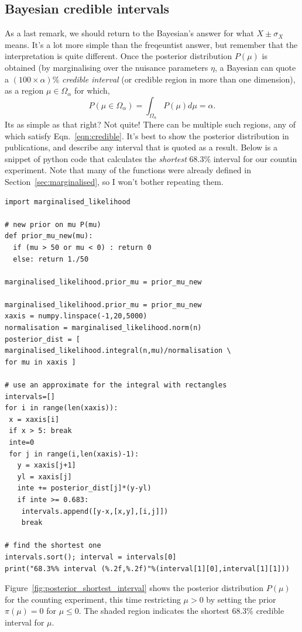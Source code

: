 \subsection{Bayesian credible intervals}
As a last remark, we should return to the Bayesian's answer for what $X\pm\sigma_{X}$ means. It's a lot more simple than the freqeuntist answer, but remember that the interpretation is quite different. Once the posterior distribution $P(\mu)$ is obtained (by marginalising over the nuisance parameters $\eta$, a Bayesian can quote a $(100\times\alpha)$\% \emph{credible interval} (or credible region in more than one dimension), as a region $\mu\in\Omega_{\alpha}$ for which,
\begin{equation}\label{eqn:credible}
    P(\mu\in\Omega_{\alpha})=\int_{\Omega_{\alpha}} P(\mu)d\mu = \alpha.
\end{equation}
Its as simple as that right? Not quite! There can be multiple such regions, any of which satisfy Eqn.~\ref{eqn:credible}. It's best to show the posterior distribution in publications, and describe any interval that is quoted as a result. Below is a snippet of python code that calculates the \emph{shortest} 68.3\% interval for our countin experiment. Note that many of the functions were already defined in Section~\ref{sec:marginalised}, so I won't bother repeating them.
\begin{lstlisting}[style = Python]
import marginalised_likelihood

# new prior on mu P(mu)
def prior_mu_new(mu):
  if (mu > 50 or mu < 0) : return 0
  else: return 1./50

marginalised_likelihood.prior_mu = prior_mu_new

marginalised_likelihood.prior_mu = prior_mu_new
xaxis = numpy.linspace(-1,20,5000)
normalisation = marginalised_likelihood.norm(n)
posterior_dist = [ marginalised_likelihood.integral(n,mu)/normalisation \
for mu in xaxis ]

# use an approximate for the integral with rectangles
intervals=[]
for i in range(len(xaxis)):
 x = xaxis[i]
 if x > 5: break
 inte=0
 for j in range(i,len(xaxis)-1):
   y = xaxis[j+1]
   yl = xaxis[j]
   inte += posterior_dist[j]*(y-yl)
   if inte >= 0.683:
    intervals.append([y-x,[x,y],[i,j]])
    break

# find the shortest one
intervals.sort(); interval = intervals[0]
print("68.3%% interval (%.2f,%.2f)"%(interval[1][0],interval[1][1]))
\end{lstlisting}

Figure~\ref{fig:posterior_shortest_interval} shows the posterior distribution $P(\mu)$ for the counting experiment, 
this time restricting $\mu>0$ by setting the prior $\pi(\mu)=0$ for $\mu\leq0$. The shaded region indicates the shortest 
68.3\% credible interval for $\mu$. 

